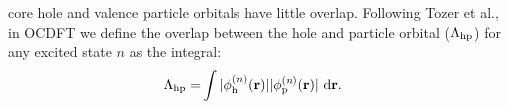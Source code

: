 \documentclass{article}
\begin{document}
core hole and valence particle orbitals have little overlap. Following Tozer et al.,\cite{peach_excitation_2008} in OCDFT we define the overlap between the hole and particle orbital ($\Lambda_{\rm hp}$) for any excited state $n$ as the integral:
\begin{align}
\Lambda_{\rm hp} = &\int |\phi^{(n)}_{\rm h} (\bf{r})||\phi^{(\textit{n})}_{\rm p} (\bf{r})| \ \rm d\bf{r}  .
\end{align}

\end{document}
